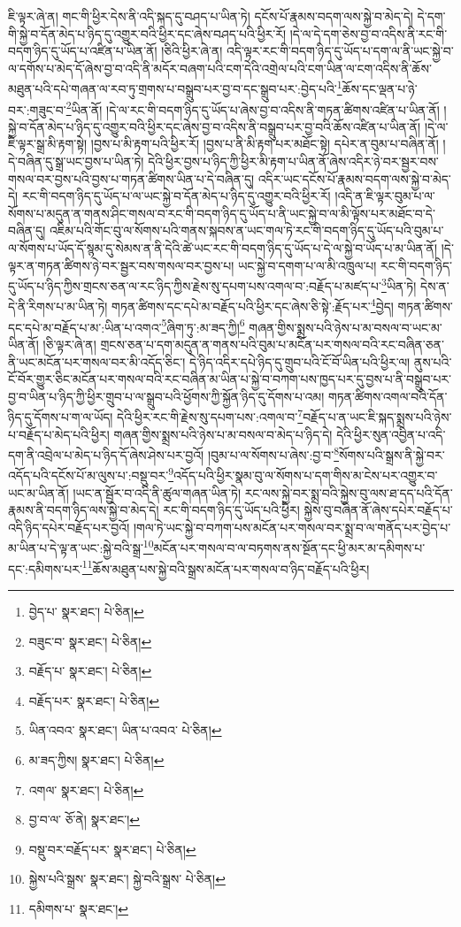 ཇི་ལྟར་ཞེ་ན། གང་གི་ཕྱིར་དེས་ནི་འདི་སྐད་དུ་བཤད་པ་ཡིན་ཏེ། དངོས་པོ་རྣམས་བདག་ལས་སྐྱེ་བ་མེད་དེ། དེ་དག་གི་སྐྱེ་བ་དོན་མེད་པ་ཉིད་དུ་འགྱུར་བའི་ཕྱིར་དང་ཞེས་བཤད་པའི་ཕྱིར་རོ། །དེ་ལ་དེ་དག་ཅེས་བྱ་བ་འདིས་ནི་རང་གི་བདག་ཉིད་དུ་ཡོད་པ་འཛིན་པ་ཡིན་ནོ། །ཅིའི་ཕྱིར་ཞེ་ན། འདི་ལྟར་རང་གི་བདག་ཉིད་དུ་ཡོད་པ་དག་ལ་ནི་ཡང་སྐྱེ་བ་ལ་དགོས་པ་མེད་དོ་ཞེས་བྱ་བ་འདི་ནི་མདོར་བཞག་པའི་ངག་དེའི་འགྲེལ་པའི་ངག་ཡིན་ལ་ངག་འདིས་ནི་ཆོས་མཐུན་པའི་དཔེ་གཞན་ལ་རབ་ཏུ་གྲགས་པ་བསྒྲུབ་པར་བྱ་བ་དང་སྒྲུབ་པར་:བྱེད་པའི་\footnote{བྱེད་པ་  སྣར་ཐང་།  པེ་ཅིན། }ཆོས་དང་ལྡན་པ་ཉེ་བར་:གཟུང་བ་\footnote{བཟུང་བ་  སྣར་ཐང་།  པེ་ཅིན། }ཡིན་ནོ། །དེ་ལ་རང་གི་བདག་ཉིད་དུ་ཡོད་པ་ཞེས་བྱ་བ་འདིས་ནི་གཏན་ཚིགས་འཛིན་པ་ཡིན་ནོ། །སྐྱེ་བ་དོན་མེད་པ་ཉིད་དུ་འགྱུར་བའི་ཕྱིར་དང་ཞེས་བྱ་བ་འདིས་ནི་བསྒྲུབ་པར་བྱ་བའི་ཆོས་འཛིན་པ་ཡིན་ནོ། །དེ་ལ་ཇི་ལྟར་སྒྲ་མི་རྟག་སྟེ། །བྱས་པ་མི་རྟག་པའི་ཕྱིར་རོ། །བྱས་པ་ནི་མི་རྟག་པར་མཐོང་སྟེ། དཔེར་ན་བུམ་པ་བཞིན་ནོ། །དེ་བཞིན་དུ་སྒྲ་ཡང་བྱས་པ་ཡིན་ཏེ། དེའི་ཕྱིར་བྱས་པ་ཉིད་ཀྱི་ཕྱིར་མི་རྟག་པ་ཡིན་ནོ་ཞེས་འདིར་ཉེ་བར་སྦྱར་བས་གསལ་བར་བྱས་པའི་བྱས་པ་གཏན་ཚིགས་ཡིན་པ་དེ་བཞིན་དུ། འདིར་ཡང་དངོས་པོ་རྣམས་བདག་ལས་སྐྱེ་བ་མེད་དེ། རང་གི་བདག་ཉིད་དུ་ཡོད་པ་ལ་ཡང་སྐྱེ་བ་དོན་མེད་པ་ཉིད་དུ་འགྱུར་བའི་ཕྱིར་རོ། །འདི་ན་ཇི་ལྟར་བུམ་པ་ལ་སོགས་པ་མདུན་ན་གནས་ཤིང་གསལ་བ་རང་གི་བདག་ཉིད་དུ་ཡོད་པ་ནི་ཡང་སྐྱེ་བ་ལ་མི་ལྟོས་པར་མཐོང་བ་དེ་བཞིན་དུ། འཇིམ་པའི་གོང་བུ་ལ་སོགས་པའི་གནས་སྐབས་ན་ཡང་གལ་ཏེ་རང་གི་བདག་ཉིད་དུ་ཡོད་པའི་བུམ་པ་ལ་སོགས་པ་ཡོད་དོ་སྙམ་དུ་སེམས་ན་ནི་དེའི་ཚེ་ཡང་རང་གི་བདག་ཉིད་དུ་ཡོད་པ་དེ་ལ་སྐྱེ་བ་ཡོད་པ་མ་ཡིན་ནོ། །དེ་ལྟར་ན་གཏན་ཚིགས་ཉེ་བར་སྦྱར་བས་གསལ་བར་བྱས་པ། ཡང་སྐྱེ་བ་དགག་པ་ལ་མི་འཁྲུལ་པ། རང་གི་བདག་ཉིད་དུ་ཡོད་པ་ཉིད་ཀྱིས་གྲངས་ཅན་ལ་རང་ཉིད་ཀྱིས་རྗེས་སུ་དཔག་པས་འགལ་བ་:བརྗོད་པ་མཛད་པ་\footnote{བརྗོད་པ་  སྣར་ཐང་།  པེ་ཅིན། }ཡིན་ཏེ། དེས་ན་དེ་ནི་རིགས་པ་མ་ཡིན་ཏེ། གཏན་ཚིགས་དང་དཔེ་མ་བརྗོད་པའི་ཕྱིར་དང་ཞེས་ཅི་སྟེ་:རྗོད་པར་\footnote{བརྗོད་པར་  སྣར་ཐང་།  པེ་ཅིན། }བྱེད། གཏན་ཚིགས་དང་དཔེ་མ་བརྗོད་པ་མ་:ཡིན་པ་འགའ་\footnote{ཡིན་འབའ་  སྣར་ཐང་། ཡིན་པ་འབའ་  པེ་ཅིན། }ཞིག་ཏུ་:མ་ཟད་ཀྱི།\footnote{མ་ཟད་ཀྱིས།  སྣར་ཐང་།  པེ་ཅིན། } གཞན་གྱིས་སྨྲས་པའི་ཉེས་པ་མ་བསལ་བ་ཡང་མ་ཡིན་ནོ། །ཅི་ལྟར་ཞེ་ན། གྲངས་ཅན་པ་དག་མདུན་ན་གནས་པའི་བུམ་པ་མངོན་པར་གསལ་བའི་རང་བཞིན་ཅན་ནི་ཡང་མངོན་པར་གསལ་བར་མི་འདོད་ཅིང་། དེ་ཉིད་འདིར་དཔེ་ཉིད་དུ་གྲུབ་པའི་ངོ་བོ་ཡིན་པའི་ཕྱིར་ལ། ནུས་པའི་ངོ་བོར་གྱུར་ཅིང་མངོན་པར་གསལ་བའི་རང་བཞིན་མ་ཡིན་པ་སྐྱེ་བ་བཀག་པས་ཁྱད་པར་དུ་བྱས་པ་ནི་བསྒྲུབ་པར་བྱ་བ་ཡིན་པ་ཉིད་ཀྱི་ཕྱིར་གྲུབ་པ་ལ་སྒྲུབ་པའི་ཕྱོགས་ཀྱི་སྐྱོན་ཉིད་དུ་དོགས་པ་འམ། གཏན་ཚིགས་འགལ་བའི་དོན་ཉིད་དུ་དོགས་པ་ག་ལ་ཡོད། དེའི་ཕྱིར་རང་གི་རྗེས་སུ་དཔག་པས་:འགལ་བ་\footnote{འགལ་  སྣར་ཐང་།  པེ་ཅིན། }བརྗོད་པ་ན་ཡང་ཇི་སྐད་སྨྲས་པའི་ཉེས་པ་བརྗོད་པ་མེད་པའི་ཕྱིར། གཞན་གྱིས་སྨྲས་པའི་ཉེས་པ་མ་བསལ་བ་མེད་པ་ཉིད་དེ། དེའི་ཕྱིར་སུན་འབྱིན་པ་འདི་དག་ནི་འབྲེལ་པ་མེད་པ་ཉིད་དོ་ཞེས་ཤེས་པར་བྱའོ། །བུམ་པ་ལ་སོགས་པ་ཞེས་:བྱ་བ་\footnote{བྱ་བ་ལ་  ཅོ་ནེ།  སྣར་ཐང་། }སོགས་པའི་སྒྲས་ནི་སྐྱེ་བར་འདོད་པའི་དངོས་པོ་མ་ལུས་པ་:བསྡུ་བར་\footnote{བསྡུ་བར་བརྗོད་པར་  སྣར་ཐང་།  པེ་ཅིན། }འདོད་པའི་ཕྱིར་སྣམ་བུ་ལ་སོགས་པ་དག་གིས་མ་ངེས་པར་འགྱུར་བ་ཡང་མ་ཡིན་ནོ། །ཡང་ན་སྦྱོར་བ་འདི་ནི་ཚུལ་གཞན་ཡིན་ཏེ། རང་ལས་སྐྱེ་བར་སྨྲ་བའི་སྐྱེས་བུ་ལས་ཐ་དད་པའི་དོན་རྣམས་ནི་བདག་ཉིད་ལས་སྐྱེ་བ་མེད་དེ། རང་གི་བདག་ཉིད་དུ་ཡོད་པའི་ཕྱིར། སྐྱེས་བུ་བཞིན་ནོ་ཞེས་དཔེར་བརྗོད་པ་འདི་ཉིད་དཔེར་བརྗོད་པར་བྱའོ། །གལ་ཏེ་ཡང་སྐྱེ་བ་བཀག་པས་མངོན་པར་གསལ་བར་སྨྲ་བ་ལ་གནོད་པར་བྱེད་པ་མ་ཡིན་པ་དེ་ལྟ་ན་ཡང་:སྐྱེ་བའི་སྒྲ་\footnote{སྐྱེས་པའི་སྒྲས་  སྣར་ཐང་། སྐྱེ་བའི་སྒྲས་  པེ་ཅིན། }མངོན་པར་གསལ་བ་ལ་བཏགས་ནས་སྔོན་དང་ཕྱི་མར་མ་དམིགས་པ་དང་:དམིགས་པར་\footnote{དམིགས་པ་  སྣར་ཐང་། }ཆོས་མཐུན་པས་སྐྱེ་བའི་སྒྲས་མངོན་པར་གསལ་བ་ཉིད་བརྗོད་པའི་ཕྱིར། 